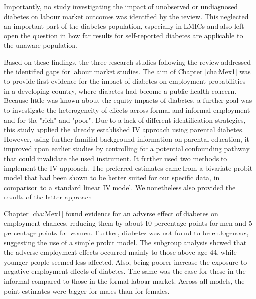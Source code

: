 Importantly, no study investigating the impact of unobserved or undiagnosed diabetes on labour market outcomes was identified by the review. This neglected an important part of the diabetes population, especially in \acp{LMIC} and also left open the question in how far results for self-reported diabetes are applicable to the unaware population.

Based on these findings, the three research studies following the review addressed the identified gaps for labour market studies. The aim of Chapter \ref{cha:Mex1} was to provide first evidence for the impact of diabetes on employment probabilities in a developing country, where diabetes had become a public health concern. Because little was known about the equity impacts of diabetes, a further goal was to investigate the heterogeneity of effects across formal and informal employment and for the "rich" and "poor". Due to a lack of different identification strategies, this study applied the already established \ac{IV} approach using parental diabetes. However, using further familial background information on parental education, it improved upon earlier studies by controlling for a potential confounding pathway that could invalidate the used instrument. It further used two methods to implement the \ac{IV} approach. The preferred estimates came from a bivariate probit model that had been shown to be better suited for our specific data, in comparison to a standard linear \ac{IV} model. We nonetheless also provided the results of the latter approach.

Chapter \ref{cha:Mex1} found evidence for an adverse effect of diabetes on employment chances, reducing them by about 10 percentage points for men and 5 percentage points for women. Further, diabetes was not found to be endogenous, suggesting the use of a simple probit model. The subgroup analysis showed that the adverse employment effects occurred mainly to those above age 44, while younger people seemed less affected. Also, being poorer increase the exposure to negative employment effects of diabetes. The same was the case for those in the informal compared to those in the formal labour market. Across all models, the point estimates were bigger for males than for females. 

